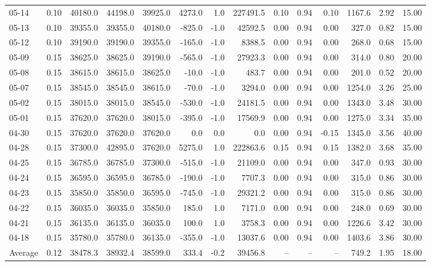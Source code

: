 \begin{threeparttable}
{\begin{tabular}{lrrrrrrrrrrrrr}
05-14 & 0.10 & 40180.0 & 44198.0 & 39925.0 & 4273.0 & 1.0 & 227491.5 & 0.10 & 0.94 & 0.10 & 1167.6 & 2.92 & 15.00 \\
05-13 & 0.10 & 39355.0 & 39355.0 & 40180.0 & -825.0 & -1.0 & 42592.5 & 0.00 & 0.94 & 0.00 & 327.0 & 0.82 & 15.00 \\
05-12 & 0.10 & 39190.0 & 39190.0 & 39355.0 & -165.0 & -1.0 & 8388.5 & 0.00 & 0.94 & 0.00 & 268.0 & 0.68 & 15.00 \\
05-09 & 0.15 & 38625.0 & 38625.0 & 39190.0 & -565.0 & -1.0 & 27923.3 & 0.00 & 0.94 & 0.00 & 314.0 & 0.80 & 20.00 \\
05-08 & 0.15 & 38615.0 & 38615.0 & 38625.0 & -10.0 & -1.0 & 483.7 & 0.00 & 0.94 & 0.00 & 201.0 & 0.52 & 20.00 \\
05-07 & 0.15 & 38545.0 & 38545.0 & 38615.0 & -70.0 & -1.0 & 3294.0 & 0.00 & 0.94 & 0.00 & 1254.0 & 3.26 & 25.00 \\
05-02 & 0.15 & 38015.0 & 38015.0 & 38545.0 & -530.0 & -1.0 & 24181.5 & 0.00 & 0.94 & 0.00 & 1343.0 & 3.48 & 30.00 \\
05-01 & 0.15 & 37620.0 & 37620.0 & 38015.0 & -395.0 & -1.0 & 17569.9 & 0.00 & 0.94 & 0.00 & 1275.0 & 3.34 & 35.00 \\
04-30 & 0.15 & 37620.0 & 37620.0 & 37620.0 & 0.0 & 0.0 & 0.0 & 0.00 & 0.94 & -0.15 & 1345.0 & 3.56 & 40.00 \\
04-28 & 0.15 & 37300.0 & 42895.0 & 37620.0 & 5275.0 & 1.0 & 222863.6 & 0.15 & 0.94 & 0.15 & 1382.0 & 3.68 & 35.00 \\
04-25 & 0.15 & 36785.0 & 36785.0 & 37300.0 & -515.0 & -1.0 & 21109.0 & 0.00 & 0.94 & 0.00 & 347.0 & 0.93 & 30.00 \\
04-24 & 0.15 & 36595.0 & 36595.0 & 36785.0 & -190.0 & -1.0 & 7707.3 & 0.00 & 0.94 & 0.00 & 315.0 & 0.86 & 30.00 \\
04-23 & 0.15 & 35850.0 & 35850.0 & 36595.0 & -745.0 & -1.0 & 29321.2 & 0.00 & 0.94 & 0.00 & 315.0 & 0.86 & 30.00 \\
04-22 & 0.15 & 36035.0 & 36035.0 & 35850.0 & 185.0 & 1.0 & 7171.0 & 0.00 & 0.94 & 0.00 & 248.0 & 0.69 & 30.00 \\
04-21 & 0.15 & 36135.0 & 36135.0 & 36035.0 & 100.0 & 1.0 & 3758.3 & 0.00 & 0.94 & 0.00 & 1226.6 & 3.42 & 30.00 \\
04-18 & 0.15 & 35780.0 & 35780.0 & 36135.0 & -355.0 & -1.0 & 13037.6 & 0.00 & 0.94 & 0.00 & 1403.6 & 3.86 & 30.00 \\
Average & 0.12 & 38478.3 & 38932.4 & 38599.0 & 333.4 & -0.2 & 39456.8 & -- & -- & -- & 749.2 & 1.95 & 18.00 \\

\end{tabular}}
\end{threeparttable}
